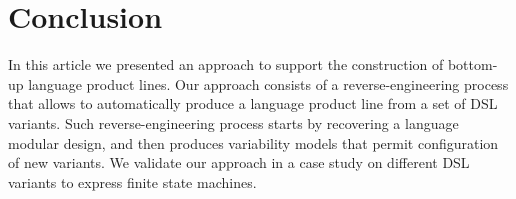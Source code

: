 \section{Conclusion}
\label{sec:conclusions}

In this article we presented an approach to support the construction of bottom-up language product lines. Our approach consists of a reverse-engineering process that allows to automatically produce a language product line from a set of DSL variants. Such reverse-engineering process starts by recovering a language modular design, and then produces variability models that permit configuration of new variants. We validate our approach in a case study on different DSL variants to express finite state machines. 